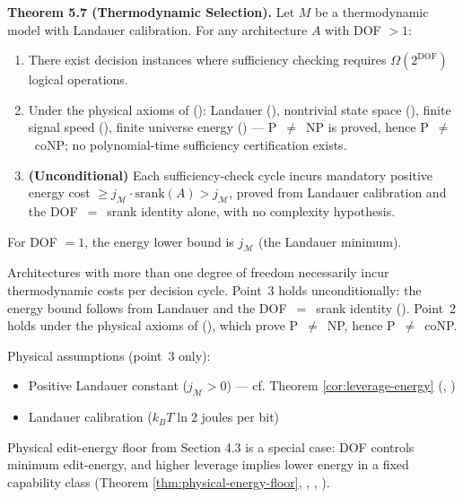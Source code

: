 \begin{formal}
\textbf{Theorem 5.7 (Thermodynamic Selection).} Let $M$ be a thermodynamic model with Landauer calibration. For any architecture $A$ with DOF $> 1$:
\begin{enumerate}
\item There exist decision instances where sufficiency checking requires $\Omega(2^{\text{DOF}})$ logical operations.
\item Under the physical axioms of \cite{paper4_decision_quotient} (): Landauer (), nontrivial state space (), finite signal speed (), finite universe energy () — P~$\neq$~NP is proved, hence P~$\neq$~coNP; no polynomial-time sufficiency certification exists.
\item \textbf{(Unconditional)} Each sufficiency-check cycle incurs mandatory positive energy cost $\geq j_{\mathcal{M}} \cdot \mathrm{srank}(A) > j_{\mathcal{M}}$, proved from Landauer calibration and the DOF~$=$~srank identity alone, with no complexity hypothesis.
\end{enumerate}
For DOF $= 1$, the energy lower bound is $j_{\mathcal{M}}$ (the Landauer minimum).
\end{formal}

\begin{informal}
Architectures with more than one degree of freedom necessarily incur thermodynamic costs per decision cycle. Point~3 holds unconditionally: the energy bound follows from Landauer and the DOF~$=$~srank identity (). Point~2 holds under the physical axioms of \cite{paper4_decision_quotient} (), which prove P~$\neq$~NP, hence P~$\neq$~coNP.
\end{informal}

Physical assumptions (point~3 only):
\begin{itemize}
\item Positive Landauer constant ($j_{\mathcal{M}} > 0$) — cf. Theorem \ref{cor:leverage-energy} (, )
\item Landauer calibration ($k_B T \ln 2$ joules per bit)
\end{itemize}


Physical edit-energy floor from Section 4.3 is a special case: DOF controls minimum edit-energy, and higher leverage implies lower energy in a fixed capability class (Theorem \ref{thm:physical-energy-floor}, , , ).

